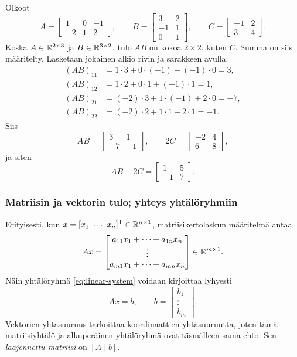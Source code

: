 \documentclass[11pt,a4paper]{amsart}
\begin{document}
  \begin{example}
    Olkoot
    \[
      A=
      \begin{bmatrix}1&0&-1\\-2&1&2
      \end{bmatrix},\qquad
      B=
      \begin{bmatrix}3&2\\-1&1\\0&1
      \end{bmatrix},\qquad
      C=
      \begin{bmatrix}-1&2\\3&4
      \end{bmatrix}.
    \]
    Koska $A\in\mathbb{R}^{2\times3}$ ja $B\in\mathbb{R}^{3\times2}$,
    tulo $AB$ on kokoa $2\times2$, kuten $C$. Summa on siis määritelty.
    Lasketaan jokainen alkio rivin ja sarakkeen avulla:
    \begin{align*}
      (AB)_{11}&=1\cdot3+0\cdot(-1)+(-1)\cdot0=3,\\
      (AB)_{12}&=1\cdot2+0\cdot1+(-1)\cdot1=1,\\
      (AB)_{21}&=(-2)\cdot3+1\cdot(-1)+2\cdot0=-7,\\
      (AB)_{22}&=(-2)\cdot2+1\cdot1+2\cdot1=-1.
    \end{align*}
    Siis
    \[
      AB=
      \begin{bmatrix}3&1\\-7&-1
      \end{bmatrix},\qquad
      2C=
      \begin{bmatrix}-2&4\\6&8
      \end{bmatrix},
    \]
    ja siten
    \[
      \boxed{AB+2C=
        \begin{bmatrix}1&5\\-1&7
      \end{bmatrix}.}
    \]
  \end{example}

  \subsubsection*{Matriisin ja vektorin tulo; yhteys yhtälöryhmiin}

  Erityisesti, kun $x=[x_1\ \cdots\ x_n]^{\mathsf T}\in\RR^{n\times1}$,
  matriisikertolaskun määritelmä antaa
  \[
    Ax=
    \begin{bmatrix}
      a_{11}x_1+\cdots+a_{1n}x_n\\
      \vdots\\
      a_{m1}x_1+\cdots+a_{mn}x_n
    \end{bmatrix}\in\mathbb{R}^{m\times1}.
  \]
  Näin yhtälöryhmä \eqref{eq:linear-system} voidaan kirjoittaa lyhyesti
  \[
    \boxed{Ax=b,\qquad b=
      \begin{bmatrix}b_1\\\vdots\\b_m
    \end{bmatrix}.}
  \]
  Vektorien yhtäsuuruus tarkoittaa koordinaattien yhtäsuuruutta, joten
  tämä matriisiyhtälö ja alkuperäinen yhtälöryhmä ovat täsmälleen sama
  ehto. Sen \emph{laajennettu matriisi} on $[A\mid b]$.
\end{document}
